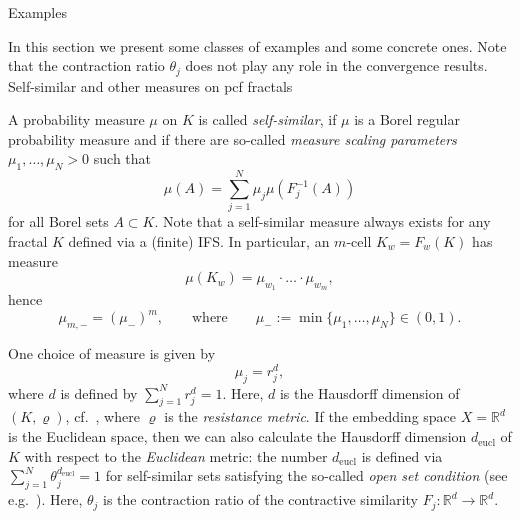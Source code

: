 \documentclass[12pt,reqno,a4paper]{amsart}            %
\makeatletter
\numberwithin{equation}{section}
\newcommand{\myfont}{\sffamily}
\theoremstyle{mythmstyle}       %
\theoremstyle{mydefstyle}        %
\renewcommand\section{\@startsection{section}{1}%
  \z@{.7\linespacing\@plus\linespacing}{.5\linespacing}%
  {\Large\myfont\bfseries}}
\renewcommand\subsection{\@startsection{subsection}{2}%
  \z@{-.5\linespacing\@plus-.7\linespacing}{.5\linespacing}%
  {\large\myfont\bfseries}}
\newcommand{\map}[3]{ #1 \colon #2 \longrightarrow #3}    %
\renewcommand{\rho}{\varrho}   %
\newcommand{\R}{\mathbb{R}} %
\newcommand{\1}{\mathbbm 1}                    %
\newcommand{\qquadtext}[1]{\qquad\text{#1}\qquad}
\newcommand{\pcf}{pcf\xspace}
\newcommand{\eucl}{\mathrm{eucl}}
\newcommand{\resistMet}{\rho}
\makeatother
\begin{document}
\section{Examples}
\label{sec:examples}
%

In this section we present some classes of examples and some concrete
ones.  Note that the contraction ratio $\theta_j$ does not play any
role in the convergence results.
\subsection{Self-similar and other measures on \pcf fractals}
\label{ssec:ex.measure}


A probability measure $\mu$ on $K$ is called \emph{self-similar}, if
$\mu$ is a Borel regular probability measure and if there are
so-called \emph{measure scaling parameters} $\mu_1,\dots,\mu_N>0$ such
that
\begin{equation}
  \label{eq:self-similar.meas}
  \mu(A)= \sum_{j=1}^N \mu_j \mu(F_j^{-1}(A))
\end{equation}
for all Borel sets $A \subset K$.  Note that a self-similar measure
always exists for any fractal $K$ defined via a (finite) IFS.  In
particular, an $m$-cell $K_w=F_w(K)$ has measure
\begin{equation*}
  \mu(K_w) = \mu_{w_1} \cdot \ldots \cdot \mu_{w_m},
\end{equation*}
hence
\begin{equation}
  \label{eq:est.mu}
  \mu_{m,-} = (\mu_-)^m,
  \qquadtext{where}
  \mu_- := \min\{\mu_1,\dots,\mu_N\} \in (0,1).
\end{equation}

One choice of measure is given by
\begin{equation*}
  \mu_j=r_j^d,
\end{equation*}
where $d$ is defined by $\sum_{j=1}^N r_j^d=1$.  Here, $d$ is the
Hausdorff dimension of $(K,\resistMet)$,
cf.~\cite[Thm.~4.2.1]{kigami:01}, where $\resistMet$ is the
\emph{resistance metric}.  If the
embedding space $X=\R^d$ is the Euclidean space, then we can also
calculate the Hausdorff dimension $d_\eucl$ of $K$ with respect to the
\emph{Euclidean} metric: the number $d_\eucl$ is defined via $\sum_{j=1}^N
\theta_j^{d_\eucl} = 1$ for self-similar sets satisfying the so-called
\emph{open set condition} (see e.g.~\cite[Sec.~1.5]{kigami:01}). Here,
$\theta_j$ is the contraction ratio of the contractive similarity
$\map{F_j}{\R^d}{\R^d}$.
\end{document}
